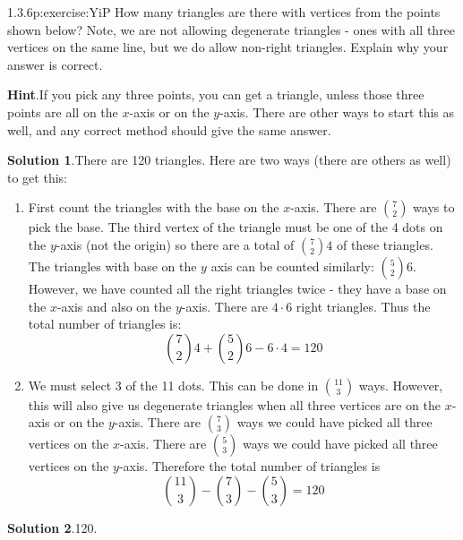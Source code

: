 \documentclass[twoside,11pt,]{book}
\newcommand{\blocktitlefont}{\relax}
\numberwithin{equation}{chapter}
\begin{document}
\begin{divisionsolution}{1.3.6}{}{p:exercise:YiP}%
How many triangles are there with vertices from the points shown below? Note, we are not allowing degenerate triangles - ones with all three vertices on the same line, but we do allow non-right triangles. Explain why your answer is correct.%
\begin{sidebyside}{1}{0.25}{0.25}{0}%
\begin{sbspanel}{0.5}%
%
\end{sbspanel}%
\end{sidebyside}%
\par\smallskip%
\noindent\textbf{\blocktitlefont Hint}.\quad{}If you pick any three points, you can get a triangle, unless those three points are all on the \(x\)-axis or on the \(y\)-axis.  There are other ways to start this as well, and any correct method should give the same answer.%
\par\smallskip%
\noindent\textbf{\blocktitlefont Solution 1}.\quad{}There are 120 triangles. Here are two ways (there are others as well) to get this:%
\begin{enumerate}[label=(\alph*)]
\item{}First count the triangles with the base on the \(x\)-axis. There are \({7 \choose 2}\) ways to pick the base. The third vertex of the triangle must be one of the 4 dots on the \(y\)-axis (not the origin) so there are a total of \({7 \choose 2}4\) of these triangles. The triangles with base on the \(y\) axis can be counted similarly: \({5 \choose 2}6\). However, we have counted all the right triangles twice - they have a base on the \(x\)-axis and also on the \(y\)-axis. There are \(4 \cdot 6\) right triangles. Thus the total number of triangles is:%
\begin{equation*}
{7 \choose 2}4 + {5 \choose 2}6 - 6\cdot 4 = 120
\end{equation*}
%
\item{}We must select 3 of the 11 dots. This can be done in \({11 \choose 3}\) ways. However, this will also give us degenerate triangles when all three vertices are on the \(x\)-axis or on the \(y\)-axis. There are \({7 \choose 3}\) ways we could have picked all three vertices on the \(x\)-axis. There are \({5 \choose 3}\) ways we could have picked all three vertices on the \(y\)-axis. Therefore the total number of triangles is%
\begin{equation*}
{11 \choose 3} - {7 \choose 3} - {5 \choose 3} = 120
\end{equation*}
%
\end{enumerate}
%
\par\smallskip%
\noindent\textbf{\blocktitlefont Solution 2}.\quad{}120.%
\end{divisionsolution}%
\end{document}
